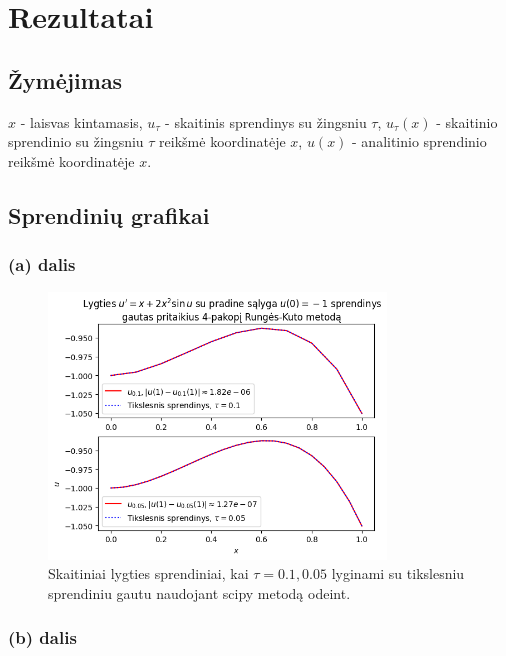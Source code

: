 \documentclass[11pt]{article}
\begin{document}
\newpage
\section{Rezultatai}

\subsection{Žymėjimas}

$x$ - laisvas kintamasis, 
$u_\tau$ - skaitinis sprendinys su žingsniu $\tau$,
$u_\tau(x)$ - skaitinio sprendinio su žingsniu $\tau$ reikšmė koordinatėje $x$,
$u(x)$ - analitinio sprendinio reikšmė koordinatėje $x$.

\subsection{Sprendinių grafikai}

\subsubsection{(a) dalis}

\begin{figure}[h!]
    \centering
    \includegraphics[width=0.8\textwidth]{a1.png}
    \caption{Skaitiniai lygties sprendiniai, kai $\tau=0.1, 0.05$ lyginami su tikslesniu sprendiniu gautu naudojant scipy metodą odeint.}
    \label{fig:pvz1}
\end{figure}

\newpage
\subsubsection{(b) dalis}
\end{document}
